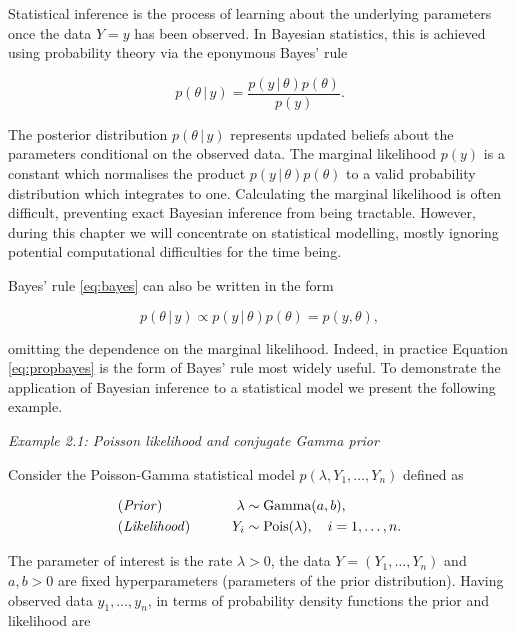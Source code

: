 \documentclass[11pt,]{book}
\begin{document}
Statistical inference is the process of learning about the underlying
parameters once the data \(Y = y\) has been observed. In Bayesian
statistics, this is achieved using probability theory via the eponymous
Bayes' rule

\begin{equation}
p(\theta \, | \, y) = \frac{p(y \, | \, \theta) p(\theta)}{p(y)}. \label{eq:bayes}
\end{equation}

The posterior distribution \(p(\theta \, | \, y)\) represents updated
beliefs about the parameters conditional on the observed data. The
marginal likelihood \(p(y)\) is a constant which normalises the product
\(p(y \, | \, \theta)p(\theta)\) to a valid probability distribution
which integrates to one. Calculating the marginal likelihood is often
difficult, preventing exact Bayesian inference from being tractable.
However, during this chapter we will concentrate on statistical
modelling, mostly ignoring potential computational difficulties for the
time being.

Bayes' rule \eqref{eq:bayes} can also be written in the form

\begin{equation}
p(\theta \, | \, y) \propto p(y \, | \, \theta) p(\theta) = p(y, \theta), \label{eq:propbayes}
\end{equation}

omitting the dependence on the marginal likelihood. Indeed, in practice
Equation \eqref{eq:propbayes} is the form of Bayes' rule most widely
useful. To demonstrate the application of Bayesian inference to a
statistical model we present the following example.

\emph{Example 2.1: Poisson likelihood and conjugate Gamma prior}

Consider the Poisson-Gamma statistical model
\(p(\lambda, Y_1, \ldots, Y_n)\) defined as

\begin{alignat}{2}
&\text{(\textit{Prior})}       &         \lambda &\sim \text{Gamma}(a, b), \\
&\text{(\textit{Likelihood})}  & \qquad      Y_i &\sim \text{Pois}(\lambda), \quad i = 1, \ldots, n.
\end{alignat}

The parameter of interest is the rate \(\lambda > 0\), the data
\(Y = (Y_1, \ldots, Y_n)\) and \(a, b > 0\) are fixed hyperparameters
(parameters of the prior distribution). Having observed data
\(y_1, \ldots, y_n\), in terms of probability density functions the
prior and likelihood are
\end{document}
